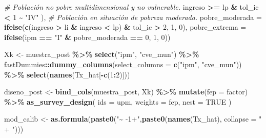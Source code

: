 \documentclass[
  12pt,
]{book}
\newenvironment{Shaded}{\begin{snugshade}}{\end{snugshade}}
\newcommand{\AttributeTok}[1]{\textcolor[rgb]{0.13,0.29,0.53}{#1}}
\newcommand{\CommentTok}[1]{\textcolor[rgb]{0.56,0.35,0.01}{\textit{#1}}}
\newcommand{\ConstantTok}[1]{\textcolor[rgb]{0.56,0.35,0.01}{#1}}
\newcommand{\DecValTok}[1]{\textcolor[rgb]{0.00,0.00,0.81}{#1}}
\newcommand{\FunctionTok}[1]{\textcolor[rgb]{0.13,0.29,0.53}{\textbf{#1}}}
\newcommand{\NormalTok}[1]{#1}
\newcommand{\OtherTok}[1]{\textcolor[rgb]{0.56,0.35,0.01}{#1}}
\newcommand{\SpecialCharTok}[1]{\textcolor[rgb]{0.81,0.36,0.00}{\textbf{#1}}}
\newcommand{\StringTok}[1]{\textcolor[rgb]{0.31,0.60,0.02}{#1}}
\begin{document}
\begin{Shaded}
\begin{Highlighting}[]
          \CommentTok{\# Población no pobre multidimensional y no vulnerable.}
\NormalTok{          ingreso }\SpecialCharTok{\textgreater{}=}\NormalTok{ lp }\SpecialCharTok{\&}\NormalTok{ tol\_ic }\SpecialCharTok{\textless{}} \DecValTok{1} \SpecialCharTok{\textasciitilde{}} \StringTok{"IV"}
\NormalTok{        ),}
        \CommentTok{\# Población en situación de pobreza moderada.}
        \AttributeTok{pobre\_moderada =} \FunctionTok{ifelse}\NormalTok{(}\FunctionTok{c}\NormalTok{(ingreso }\SpecialCharTok{\textgreater{}}\NormalTok{ li }\SpecialCharTok{\&}\NormalTok{ ingreso }\SpecialCharTok{\textless{}}\NormalTok{ lp) }\SpecialCharTok{\&}
\NormalTok{                                  tol\_ic }\SpecialCharTok{\textgreater{}} \DecValTok{2}\NormalTok{, }\DecValTok{1}\NormalTok{, }\DecValTok{0}\NormalTok{),}
        \AttributeTok{pobre\_extrema =} \FunctionTok{ifelse}\NormalTok{(ipm }\SpecialCharTok{==} \StringTok{"I"} \SpecialCharTok{\&}\NormalTok{ pobre\_moderada }\SpecialCharTok{==} \DecValTok{0}\NormalTok{, }\DecValTok{1}\NormalTok{, }\DecValTok{0}\NormalTok{))  }

\NormalTok{    Xk }\OtherTok{\textless{}{-}}\NormalTok{ muestra\_post }\SpecialCharTok{\%\textgreater{}\%} \FunctionTok{select}\NormalTok{(}\StringTok{"ipm"}\NormalTok{, }\StringTok{"cve\_mun"}\NormalTok{) }\SpecialCharTok{\%\textgreater{}\%} 
\NormalTok{      fastDummies}\SpecialCharTok{::}\FunctionTok{dummy\_columns}\NormalTok{(}\AttributeTok{select\_columns =} \FunctionTok{c}\NormalTok{(}\StringTok{"ipm"}\NormalTok{, }\StringTok{"cve\_mun"}\NormalTok{)) }\SpecialCharTok{\%\textgreater{}\%} 
      \FunctionTok{select}\NormalTok{(}\FunctionTok{names}\NormalTok{(Tx\_hat[}\SpecialCharTok{{-}}\FunctionTok{c}\NormalTok{(}\DecValTok{1}\SpecialCharTok{:}\DecValTok{2}\NormalTok{)]))}

\NormalTok{    diseno\_post }\OtherTok{\textless{}{-}} \FunctionTok{bind\_cols}\NormalTok{(muestra\_post, Xk) }\SpecialCharTok{\%\textgreater{}\%} 
      \FunctionTok{mutate}\NormalTok{(}\AttributeTok{fep =}\NormalTok{ factor) }\SpecialCharTok{\%\textgreater{}\%}
      \FunctionTok{as\_survey\_design}\NormalTok{(}
        \AttributeTok{ids =}\NormalTok{ upm,}
        \AttributeTok{weights =}\NormalTok{ fep,}
        \AttributeTok{nest =} \ConstantTok{TRUE}
\NormalTok{      )}

\NormalTok{    mod\_calib }\OtherTok{\textless{}{-}}  \FunctionTok{as.formula}\NormalTok{(}\FunctionTok{paste0}\NormalTok{(}\StringTok{"\textasciitilde{} {-}1+"}\NormalTok{,}\FunctionTok{paste0}\NormalTok{(}\FunctionTok{names}\NormalTok{(Tx\_hat), }\AttributeTok{collapse =} \StringTok{" + "}\NormalTok{)))}


\end{Highlighting}
\end{Shaded}
\end{document}
